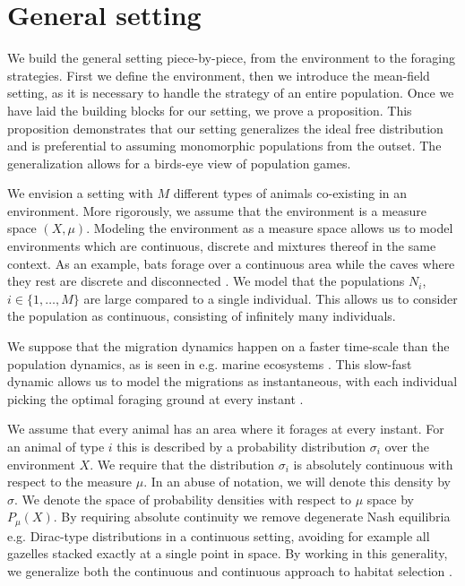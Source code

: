 \section{General setting}
\label{sec:general_setting}
We build the general setting piece-by-piece, from the environment to the foraging strategies. First we define the environment, then we introduce the mean-field setting, as it is necessary to handle the strategy of an entire population. Once we have laid the building blocks for our setting, we prove a proposition. This proposition demonstrates that our setting generalizes the ideal free distribution and is preferential to assuming monomorphic populations from the outset. The generalization allows for a birds-eye view of population games.

We envision a setting with $M$ different types of animals co-existing in an environment.  More rigorously, we assume that the environment is a measure space $(X,\mu)$. Modeling the environment as a measure space allows us to model environments which are continuous, discrete and mixtures thereof in the same context. As an example, bats forage over a continuous area while the caves where they rest are discrete and disconnected \citep{collet2019algorithmic}. We model that the populations $N_i$, $i\in \{1,\dots,M\}$  are large compared to a single individual. This allows us to consider the population as continuous, consisting of infinitely many individuals. %


We suppose that the migration dynamics happen on a faster time-scale than the population dynamics, as is seen in e.g. marine ecosystems \citep{iwasa1982vertical}. This slow-fast dynamic allows us to model the migrations as instantaneous, with each individual picking the optimal foraging ground at every instant \citep{kvrivan2013behavioral, cressman2006migration}.


We assume that every animal has an area where it forages at every instant. For an animal of type $i$ this is described by a probability distribution $\sigma_i$ over the environment $X$. We require that the distribution $\sigma_i$ is absolutely continuous with respect to the measure $\mu$. In an abuse of notation, we will denote this density by $\sigma$. We denote the space of probability densities with respect to $\mu$ space by $P_{\mu}(X)$. By requiring absolute continuity we remove degenerate Nash equilibria e.g. Dirac-type distributions in a continuous setting, avoiding for example all gazelles stacked exactly at a single point in space. By working in this generality, we generalize both the continuous and continuous approach to habitat selection \citep{fretwell1969territorial, broom2013game, verticalmigration}.


